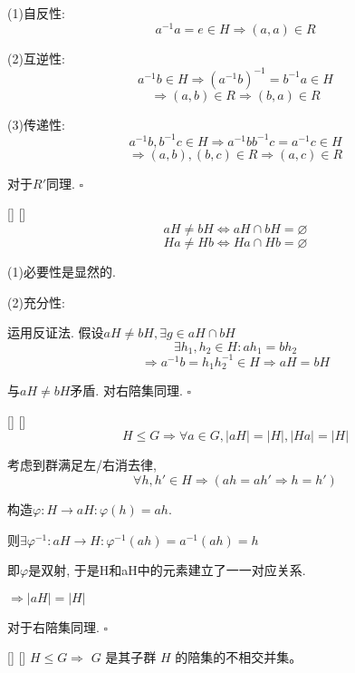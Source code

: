 \documentclass[UTF8]{ctexart}
\begin{document}
		\begin{prf}
			(1)自反性: 
			\[a^{-1}a=e\in H\Longrightarrow (a,a)\in R\]
			
			(2)互逆性: 
			\[a^{-1}b\in H\Longrightarrow (a^{-1}b)^{-1}=b^{-1}a\in H\]
			\[\Longrightarrow(a,b)\in R\Longrightarrow (b,a)\in R\]
			
			(3)传递性: 
			\[a^{-1}b,b^{-1}c\in H\Longrightarrow a^{-1}bb^{-1}c=a^{-1}c\in H\]
			\[\Longrightarrow(a,b),(b,c)\in R\Longrightarrow(a,c)\in R\]
			
			对于$R'$同理. $\square$
		\end{prf}
		
		\begin{ppt}
            []
            {}
            []
            []
			\[aH\neq bH\iff aH\cap bH=\varnothing\]
			\[Ha\neq Hb\iff Ha\cap Hb=\varnothing\]
		\end{ppt}
		\begin{prf}
	
			(1)必要性是显然的. 
			
			(2)充分性: 
			
			运用反证法. 假设$aH\neq bH, \exists g\in aH\cap bH$
			\[\exists h_{1},h_{2}\in H: ah_{1}=bh_{2}\]
			\[\Longrightarrow a^{-1}b=h_{1}h_{2}^{-1}\in H\Longrightarrow aH=bH\]
			
			与$aH\neq bH$矛盾. 对右陪集同理. $\square$
		\end{prf}
  
		\begin{ppt}
            []
            {}
            []
            []
			\[H\leq G\Longrightarrow\forall a\in G,|aH|=|H|,|Ha|=|H|\]
		\end{ppt}
  
		\begin{prf} 
			
			考虑到群满足左/右消去律, 
			\[\forall h,h'\in H\Longrightarrow(ah=ah'\Longrightarrow h=h')\]
			
			构造$\varphi: H\to aH: \varphi(h)=ah$. 
			
			则$\exists\varphi^{-1}:aH\to H: \varphi^{-1}(ah)=a^{-1}(ah)=h$
			
			即$\varphi$是双射, 于是H和aH中的元素建立了一一对应关系. 
			
			$\Longrightarrow |aH|=|H|$
			
			对于右陪集同理. $\square$
		\end{prf}

            \begin{ppt}
            []
            {}
            []
            []
               \(H\leq G\Longrightarrow \) \( G \) 是其子群 \( H \) 的陪集的不相交并集。
           \end{ppt}
\end{document}
